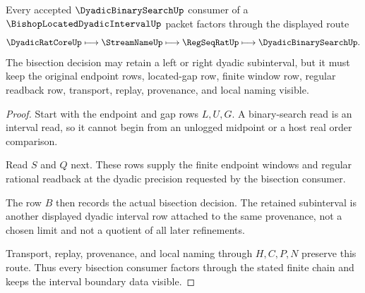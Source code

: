 \begin{theorem}
\label{thm:bishop-located-dyadic-interval-bisection-readback}
Every accepted $\DyadicBinarySearchUp$ consumer of a $\BishopLocatedDyadicIntervalUp$ packet factors through the displayed route
$$
\DyadicRatCoreUp
\longmapsto
\StreamNameUp
\longmapsto
\RegSeqRatUp
\longmapsto
\DyadicBinarySearchUp .
$$
The bisection decision may retain a left or right dyadic subinterval, but it must keep the original endpoint rows, located-gap row, finite window row, regular readback row, transport, replay, provenance, and local naming visible.
\end{theorem}
\begin{proof}
Start with the endpoint and gap rows $L,U,G$. A binary-search read is an interval read, so it cannot begin from an unlogged midpoint or a host real order comparison.

Read $S$ and $Q$ next. These rows supply the finite endpoint windows and regular rational readback at the dyadic precision requested by the bisection consumer.

The row $B$ then records the actual bisection decision. The retained subinterval is another displayed dyadic interval row attached to the same provenance, not a chosen limit and not a quotient of all later refinements.

Transport, replay, provenance, and local naming through $H,C,P,N$ preserve this route. Thus every bisection consumer factors through the stated finite chain and keeps the interval boundary data visible.
\end{proof}


